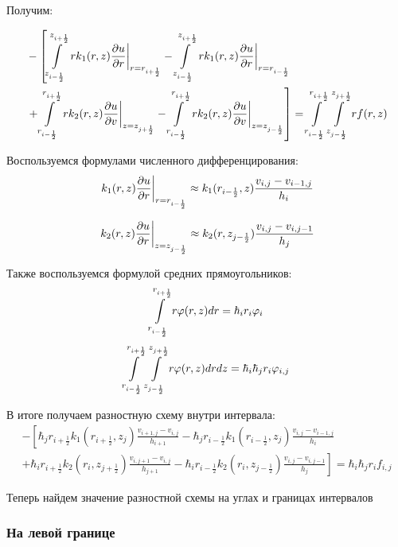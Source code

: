 Получим:

\begin{align*}
  &- \left [
   \int\limits^{z_{i+\frac{1}{2}}}_{z_{i-\frac{1}{2}}}  \left . r k_1(r, z) \pdv{u}{r} \right \vert_{r = r_{i + \frac{1}{2}}}
  - \int\limits^{z_{i+\frac{1}{2}}}_{z_{i-\frac{1}{2}}} \left . r k_1(r, z) \pdv{u}{r} \right \vert_{r = r_{i - \frac{1}{2}}}
  \right . \\
  &\left . + \int\limits^{r_{i+\frac{1}{2}}}_{r_{i-\frac{1}{2}}} \left . rk_2(r, z)\pdv{u}{v} \right \vert_{z = z_{j + \frac{1}{2}}}
  - \int\limits^{r_{i+\frac{1}{2}}}_{r_{i-\frac{1}{2}}} \left . rk_2(r, z)\pdv{u}{v} \right \vert_{z = z_{j - \frac{1}{2}}}
  \right ] = \int\limits^{r_{i +\frac{1}{2}}}_{r_{i -\frac{1}{2}}} \int\limits^{z_{j +\frac{1}{2}}}_{z_{j -\frac{1}{2}}} rf(r, z)
\end{align*}

Воспользуемся формулами численного дифференцирования:
\[
  \left . k_1(r, z) \pdv{u}{r} \right \vert_{r = r_{i - \frac{1}{2}}}
  \approx k_1(r_{i - \frac{1}{2}}, z) 
  \frac{v_{i, j} - v_{i - 1, j}}{h_i}
\]

\[
  \left . k_2(r, z) \pdv{u}{r} \right \vert_{z = z_{j - \frac{1}{2}}}
  \approx k_2(r, z_{j - \frac{1}{2}}) 
  \frac{v_{i, j} - v_{i, j - 1}}{h_j}
\]

Также воспользуемся формулой средних прямоугольников:
\[
  \int\limits^{r_{i+\frac{1}{2}}}_{r_{i-\frac{1}{2}}} r \varphi(r, z) dr
  = \hbar_i r_i \varphi_i
\]
\[
  \int\limits^{r_{i +\frac{1}{2}}}_{r_{i -\frac{1}{2}}} \int\limits^{z_{j +\frac{1}{2}}}_{z_{j -\frac{1}{2}}} r \varphi(r, z) drdz
  = \hbar_i\hbar_j r_i \varphi_{i, j}
\]

В итоге получаем разностную схему внутри интервала:
\begin{align*}
  - \left [ 
  \hbar_j r_{i+\frac{1}{2}} k_1(r_{i+\frac{1}{2}}, z_j) \frac{v_{i+1, j} - v_{i, j}}{h_{i + 1}}
  - \hbar_j r_{i-\frac{1}{2}} k_1(r_{i-\frac{1}{2}}, z_j) \frac{v_{i, j} - v_{i - 1, j}}{h_{i}}
  \right . \\
  \left .
  + \hbar_i r_{i+\frac{1}{2}} k_2(r_i, z_{j+\frac{1}{2}}) \frac{v_{i, j + 1} - v_{i, j}}{h_{j + 1}}
  - \hbar_i r_{i-\frac{1}{2}} k_2(r_i, z_{j-\frac{1}{2}}) \frac{v_{i, j} - v_{i, j - 1}}{h_j}
  \right ]  = \hbar_i \hbar_j r_i f_{i, j}
\end{align*}

Теперь найдем значение разностной схемы на углах и границах интервалов

\subsubsection{На левой границе}


